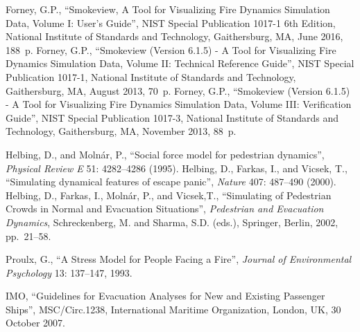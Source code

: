 \documentclass{article}
\begin{document}
\begin{thebibliography}{99}

%
 Forney, G.P., ``Smokeview, A Tool for
  Visualizing Fire Dynamics Simulation Data, Volume I: User's Guide'',
  NIST Special Publication 1017-1 6th Edition, National Institute of
  Standards and Technology, Gaithersburg, MA, June 2016, 188~p.
%
 Forney, G.P., ``Smokeview (Version 6.1.5) - A
  Tool for Visualizing Fire Dynamics Simulation Data, Volume II:
  Technical Reference Guide'', NIST Special Publication 1017-1,
  National Institute of Standards and Technology, Gaithersburg, MA,
  August 2013, 70~p.
%
 Forney, G.P., ``Smokeview (Version 6.1.5) - A
  Tool for Visualizing Fire Dynamics Simulation Data, Volume III:
  Verification Guide'', NIST Special Publication 1017-3, National
  Institute of Standards and Technology, Gaithersburg, MA, November
  2013, 88~p.

%
 Helbing, D., and Moln\'ar, P., ``Social force
  model for pedestrian dynamics'', \emph{Physical Review E} 51:
  4282--4286 (1995).
%
 Helbing, D., Farkas, I., and Vicsek, T.,
  ``Simulating dynamical features of escape panic'', \emph{Nature}
  407: 487--490 (2000).
%
 Helbing, D., Farkas, I., Moln\'ar, P., and
  Vicsek,T., ``Simulating of Pedestrian Crowds in Normal and
  Evacuation Situations'', \emph{Pedestrian and Evacuation Dynamics},
  Schreckenberg, M. and Sharma, S.D. (eds.), Springer, Berlin, 2002,
  pp.~21--58.

%
 Proulx, G., ``A Stress Model for People Facing a
  Fire'', \emph{Journal of Environmental Psychology} 13: 137--147,
  1993.
%
%

 IMO, ``Guidelines for Evacuation Analyses for
  New and Existing Passenger Ships'', MSC/Circ.1238, International
  Maritime Organization, London, UK, 30 October 2007.
  
%

%
\end{thebibliography}
\end{document}

